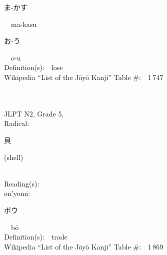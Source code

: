\begin{multicols}{2}
{\hspace*{2em}}{\begin{CJK}{UTF8}{min} ま-かす \end{CJK}}\ \ ma-kasu\ \ \\
{\hspace*{2em}}{\begin{CJK}{UTF8}{min} お-う \end{CJK}}\ \ o-u\ \ \\
Definition(s):\ \ lose \\
Wikipedia ``List of the J\=oy\=o Kanji'' Table \#:\ \ 1\,747 \\
\ \ \\
{\fontsize{34pt}{40pt}  }\ \ \\  %
{JLPT N2, Grade 5, \\Radical:\ \ {\begin{CJK}{UTF8}{min} 貝 \end{CJK}} (shell) } \\
Reading(s):\ \ \\
{\hspace*{1em}}on'yomi:\ \ \\
{\hspace*{2em}}{\begin{CJK}{UTF8}{min} ボウ \end{CJK}}\ \ b\=o\ \ \\
Definition(s):\ \ trade \\
Wikipedia ``List of the J\=oy\=o Kanji'' Table \#:\ \ 1\,869 \\
\ \ \\
\end{multicols}



